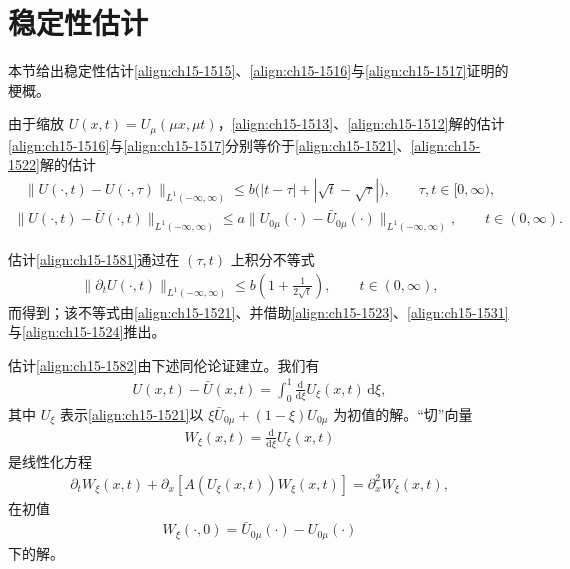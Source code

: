 \documentclass[../../main.tex]{subfiles}
\begin{document}
\section{稳定性估计}\label{section:ch15-稳定性估计}

本节给出稳定性估计\eqref{align:ch15-1515}、\eqref{align:ch15-1516}与\eqref{align:ch15-1517}证明的梗概。

由于缩放 $U(x,t)=U_\mu(\mu x,\mu t)$，\eqref{align:ch15-1513}、\eqref{align:ch15-1512}解的估计\eqref{align:ch15-1516}与\eqref{align:ch15-1517}分别等价于\eqref{align:ch15-1521}、\eqref{align:ch15-1522}解的估计
\begin{align}
\|U(\cdot,t)-U(\cdot,\tau)\|_{L^1(-\infty,\infty)}\leqslant b\bigl(|t-\tau|+|\sqrt{t}-\sqrt{\tau}|\bigr),\qquad\tau,t\in[0,\infty),
\label{align:ch15-1581}
\end{align}
\begin{align}
\|U(\cdot,t)-\bar U(\cdot,t)\|_{L^1(-\infty,\infty)}\leqslant a\|U_{0\mu}(\cdot)-\bar U_{0\mu}(\cdot)\|_{L^1(-\infty,\infty)},\qquad t\in(0,\infty).
\label{align:ch15-1582}
\end{align}

估计\eqref{align:ch15-1581}通过在 $(\tau,t)$ 上积分不等式
\begin{align}
\|\partial_tU(\cdot,t)\|_{L^1(-\infty,\infty)}\leqslant b\left(1+\frac1{2\sqrt{t}}\right),\qquad t\in(0,\infty),
\label{align:ch15-1583}
\end{align}
而得到；该不等式由\eqref{align:ch15-1521}、并借助\eqref{align:ch15-1523}、\eqref{align:ch15-1531}与\eqref{align:ch15-1524}推出。

估计\eqref{align:ch15-1582}由下述同伦论证建立。我们有
\begin{align}
U(x,t)-\bar U(x,t)=\int_0^1\frac{\mathrm{d}}{\mathrm{d}\xi}U_\xi(x,t)\,\mathrm{d}\xi,
\label{align:ch15-1584}
\end{align}
其中 $U_\xi$ 表示\eqref{align:ch15-1521}以 $\xi\bar U_{0\mu}+(1-\xi)U_{0\mu}$ 为初值的解。“切”向量
\begin{align}
W_\xi(x,t)=\frac{\mathrm{d}}{\mathrm{d}\xi}U_\xi(x,t)
\label{align:ch15-1585}
\end{align}
是线性化方程
\begin{align}
\partial_tW_\xi(x,t)+\partial_x\left[A(U_\xi(x,t))W_\xi(x,t)\right]=\partial_x^2W_\xi(x,t),
\label{align:ch15-1586}
\end{align}
在初值
\begin{align}
W_\xi(\cdot,0)=\bar U_{0\mu}(\cdot)-U_{0\mu}(\cdot)
\label{align:ch15-1587}
\end{align}
下的解。
\end{document}
